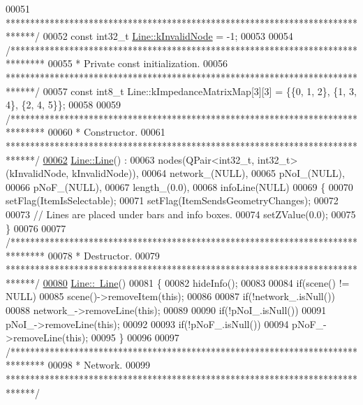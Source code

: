 \begin{DoxyCode}
00051 \textcolor{comment}{ ******************************************************************************/}
00052 \textcolor{keyword}{const} int32\_t \hyperlink{group___models_gadc334bd07c6126abc56e531d7e3e72b4}{Line::kInvalidNode} = -1;
00053 
00054 \textcolor{comment}{/*******************************************************************************}
00055 \textcolor{comment}{ * Private const initialization.}
00056 \textcolor{comment}{ ******************************************************************************/}
00057 \textcolor{keyword}{const} int8\_t Line::kImpedanceMatrixMap[3][3] = \{\{0, 1, 2\}, \{1, 3, 4\}, \{2, 4, 5\}\};
00058 
00059 \textcolor{comment}{/*******************************************************************************}
00060 \textcolor{comment}{ * Constructor.}
00061 \textcolor{comment}{ ******************************************************************************/}
\hypertarget{line_8cpp_source_l00062}{}\hyperlink{group___models_gacc11b8a429d8cdd63ba6803dff5602b3}{00062} \hyperlink{group___models_gacc11b8a429d8cdd63ba6803dff5602b3}{Line::Line}() :
00063   nodes(QPair<int32\_t, int32\_t>(kInvalidNode, kInvalidNode)),
00064   network\_(NULL),
00065   pNoI\_(NULL),
00066   pNoF\_(NULL),
00067   length\_(0.0),
00068   infoLine(NULL)
00069 \{
00070   setFlag(ItemIsSelectable);
00071   setFlag(ItemSendsGeometryChanges);
00072 
00073   \textcolor{comment}{// Lines are placed under bars and info boxes.}
00074   setZValue(0.0);
00075 \}
00076 
00077 \textcolor{comment}{/*******************************************************************************}
00078 \textcolor{comment}{ * Destructor.}
00079 \textcolor{comment}{ ******************************************************************************/}
\hypertarget{line_8cpp_source_l00080}{}\hyperlink{group___models_gaabe85f48d22d92b62257091f48174fac}{00080} \hyperlink{group___models_gaabe85f48d22d92b62257091f48174fac}{Line::~Line}()
00081 \{
00082   hideInfo();
00083 
00084   \textcolor{keywordflow}{if}(scene() != NULL)
00085     scene()->removeItem(\textcolor{keyword}{this});
00086 
00087   \textcolor{keywordflow}{if}(!network\_.isNull())
00088     network\_->removeLine(\textcolor{keyword}{this});
00089 
00090   \textcolor{keywordflow}{if}(!pNoI\_.isNull())
00091     pNoI\_->removeLine(\textcolor{keyword}{this});
00092 
00093   \textcolor{keywordflow}{if}(!pNoF\_.isNull())
00094     pNoF\_->removeLine(\textcolor{keyword}{this});
00095 \}
00096 
00097 \textcolor{comment}{/*******************************************************************************}
00098 \textcolor{comment}{ * Network.}
00099 \textcolor{comment}{ ******************************************************************************/}

\end{DoxyCode}
